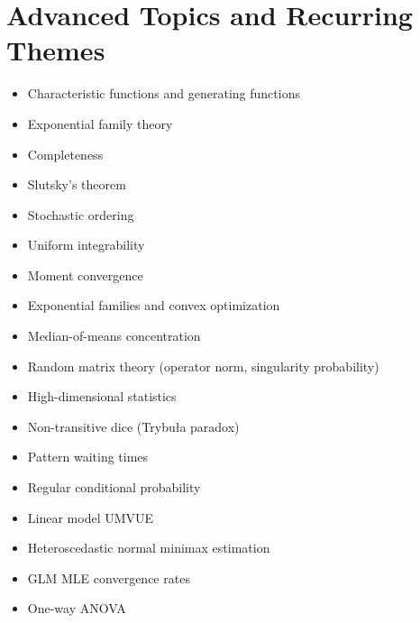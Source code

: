 \documentclass{amsart}
\begin{document}
\section{Advanced Topics and Recurring Themes}

\begin{itemize}
  \item Characteristic functions and generating functions
  \item Exponential family theory
  \item Completeness
  \item Slutsky's theorem
  \item Stochastic ordering
  \item Uniform integrability
  \item Moment convergence
  \item Exponential families and convex optimization
  \item Median-of-means concentration
  \item Random matrix theory (operator norm, singularity probability)
  \item High-dimensional statistics
  \item Non-transitive dice (Trybu\l a paradox)
  \item Pattern waiting times
  \item Regular conditional probability
  \item Linear model UMVUE
  \item Heteroscedastic normal minimax estimation
  \item GLM MLE convergence rates
  \item One-way ANOVA
\end{itemize}
\end{document}

